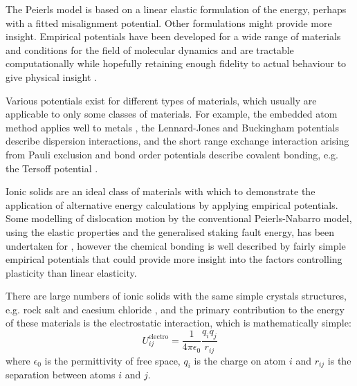 


The Peierls model is based on a linear elastic formulation of the energy, perhaps with a fitted misalignment potential. Other formulations might provide more insight. Empirical potentials have been developed for a wide range of materials and conditions for the field of molecular dynamics and are tractable computationally while hopefully retaining enough fidelity to actual behaviour to give physical insight \cite{martinez2013}.

Various potentials exist for different types of materials, which usually are applicable to only some classes of materials. For example, the embedded atom method applies well to metals \cite{Daw1984}, the Lennard-Jones and Buckingham potentials describe dispersion interactions, and the short range exchange interaction arising from Pauli exclusion \cite{Jones1924,Buckingham1938} and bond order potentials describe covalent bonding, e.g. the Tersoff potential \cite{Tersoff1988}. 


Ionic solids are an ideal class of materials with which to demonstrate the application of alternative energy calculations by applying empirical potentials. Some modelling of dislocation motion by the conventional Peierls-Nabarro model, using the elastic properties and the generalised staking fault energy, has been undertaken for  \cite{Miranda2005}, however the chemical bonding is well described by fairly simple empirical potentials that could provide more insight into the factors controlling plasticity than linear elasticity. 

There are large numbers of ionic solids with the same simple crystals structures, e.g. rock salt and caesium chloride \cite{Kelly2012app7}, and the primary contribution to the energy of these materials is the electrostatic interaction, which is mathematically simple:
\begin{equation}
U^{\text{electro}}_{ij} = \frac{1}{4\pi\epsilon_0} \frac{q_i q_j}{r_{ij}}
\end{equation}
where $\epsilon_0$ is the permittivity of free space, $q_i$ is the charge on atom $i$ and $r_{ij}$ is the separation between atoms $i$ and $j$.


